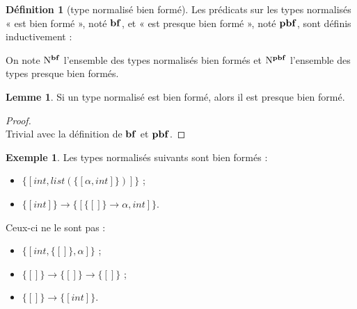 \documentclass[a4paper]{report}
\newenvironment{preuve} 
  {\begin{proof}~\\} 
  {\end{proof}}
\theoremstyle{definition}
\newtheorem{definition}[theoreme]{Définition}
\newtheorem{lemme}[theoreme]{Lemme}
\newtheorem{exemple}[theoreme]{Exemple}
\newcommand{\interval}[2]{[\![#1\,;#2]\!]}
\newcommand{\mset}[1]{\{\![#1]\!\}}
\newcommand{\F}{\mathscr{F}}
\newcommand{\N}{\mathrm{N}}
\begin{document}
\begin{definition}[type normalisé bien formé]
  Les prédicats sur les types normalisés « est bien formé », noté $\bold{bf}$, et « est presque bien formé », noté $\bold{pbf}$, sont définis inductivement :
  On note $\N^{\bold{bf}}$ l'ensemble des types normalisés bien formés et $\N^{\bold{pbf}}$ l'ensemble des types presque bien formés.
\end{definition}

\begin{lemme} \label{bf_implique_pfb}
  Si un type normalisé est bien formé, alors il est presque bien formé.
\end{lemme}

\begin{preuve}
  Trivial avec la définition de $\bold{bf}$ et $\bold{pbf}$.
\end{preuve}

\begin{exemple}
  Les types normalisés suivants sont bien formés :
  \begin{itemize}
    \item $\mset{int, list (\mset{\alpha, int})}$ ;
    \item $\mset{int} \rightarrow \mset{\mset{} \rightarrow \alpha, int}$.
  \end{itemize}
  Ceux-ci ne le sont pas :
  \begin{itemize}
    \item $\mset{int, \mset{}, \alpha}$ ;
    \item $\mset{} \rightarrow \mset{} \rightarrow \mset{}$ ;
    \item $\mset{} \rightarrow \mset{int}$.
  \end{itemize}
\end{exemple}
\end{document}
